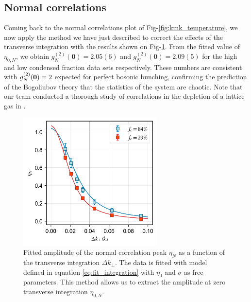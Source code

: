 

\subsection{Normal correlations}

Coming back to the normal correlations plot of Fig-\ref{fig:kmk_temperature}, we now apply the method we have just described to correct the effects of the transverse integration with the results shown on Fig-\ref{fig:integration_kk}. From the fitted value of $\eta_{0,N}$, we obtain $g^{(2)}_N(\bm{0})=2.05(6)$ and $g^{(2)}_N(\bm{0})=2.09(5)$ for the high and low condensed fraction data sets respectively. These numbers are consistent with $g^{(2)}_N (\bm{0})=2$ expected for perfect bosonic bunching, confirming the prediction of the Bogoliubov theory that the statistics of the system are chaotic. Note that our team conducted a thorough study of \kk correlations in the depletion of a lattice gas in \cite{cayla2020}. 

\begin{figure}
    \centering
    \includegraphics[width=0.65\textwidth]{Fig/Chapter4/eta_vs_int_kk.png}
    \caption{Fitted amplitude of the normal correlation peak $\eta_N$ as a function of the transverse integration $\Delta k_{\perp}$. The data is fitted with model defined in equation \ref{eq:fit_integration} with $\eta_0$ and $\sigma$ as free parameters. This method allows us to extract the amplitude at zero transverse integration $\eta_{0,N}$.}
    \label{fig:integration_kk}
\end{figure}

